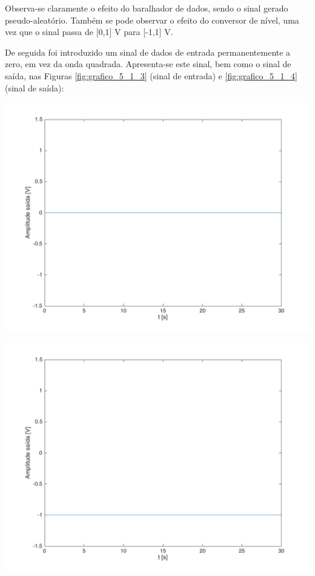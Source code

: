 \documentclass[a4paper,11pt]{report}
\begin{document}
Observa-se claramente o efeito do baralhador de dados, sendo o sinal gerado pseudo-aleatório. Também se pode observar o efeito do conversor de nível, uma vez que o sinal passa de [0,1] V para [-1,1] V.

De seguida foi introduzido um sinal de dados de entrada permanentemente a zero, em vez da onda quadrada. Apresenta-se este sinal, bem como o sinal de saída, nas Figuras \ref{fig:grafico_5_1_3} (sinal de entrada) e \ref{fig:grafico_5_1_4} (sinal de saída):

\begin{minipage}[t]{0.5\textwidth}
  \includegraphics[angle=0,width=1\textwidth]{grafico_5_1_3.png}
     \label{fig:grafico_5_1_3}
     \end{minipage}%
\hspace{0.3cm}
\begin{minipage}[t]{0.5\textwidth}
  \includegraphics[angle=0,width=1\textwidth]{grafico_5_1_4.png}
     \label{fig:grafico_5_1_4}
     \end{minipage}\\
\end{document}
